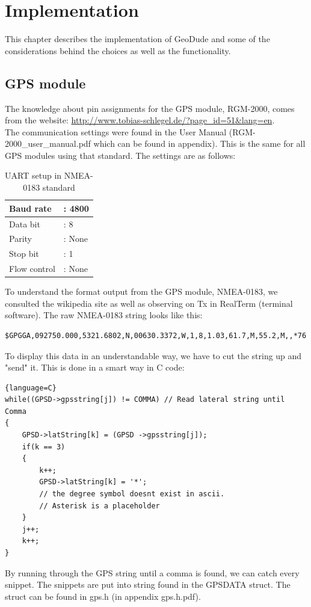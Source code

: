 \chapter{Implementation}
This chapter describes the implementation of GeoDude and some of the considerations behind the choices as well as the functionality.

\section{GPS module}
The knowledge about pin assignments for the GPS module, RGM-2000, comes from the website: \url{http://www.tobias-schlegel.de/?page_id=51&lang=en}.\\
The communication settings were found in the User Manual (RGM-2000\_user\_manual.pdf which can be found in appendix). This is the same for all GPS modules using that standard. The settings are as follows:
\begin{table}[H]
    \begin{tabular}{|ll|}
    \hline
    Baud rate    & : 4800 \\ \hline
    Data bit     & : 8    \\ \hline
    Parity       & : None \\ \hline
    Stop bit     & : 1    \\ \hline
    Flow control & : None \\ \hline
    \end{tabular}
    \caption{UART setup in NMEA-0183 standard}
\end{table}
To understand the format output from the GPS module, NMEA-0183, we consulted the wikipedia site as well as observing on Tx in RealTerm (terminal software). The raw NMEA-0183 string looks like this:
\begin{verbatim}
$GPGGA,092750.000,5321.6802,N,00630.3372,W,1,8,1.03,61.7,M,55.2,M,,*76
\end{verbatim}
To display this data in an understandable way, we have to cut the string up and "send" it. This is done in a smart way in C code:
\begin{lstlisting}{language=C}
while((GPSD->gpsstring[j]) != COMMA) // Read lateral string until Comma
{
	GPSD->latString[k] = (GPSD ->gpsstring[j]);
	if(k == 3)
	{
		k++;
		GPSD->latString[k] = '*';   
		// the degree symbol doesnt exist in ascii. 
		// Asterisk is a placeholder
	}
	j++;
	k++;
}
\end{lstlisting}
By running through the GPS string until a comma is found, we can catch every snippet. The snippets are put into string found in the GPSDATA struct. The struct can be found in gps.h (in appendix gps.h.pdf).

